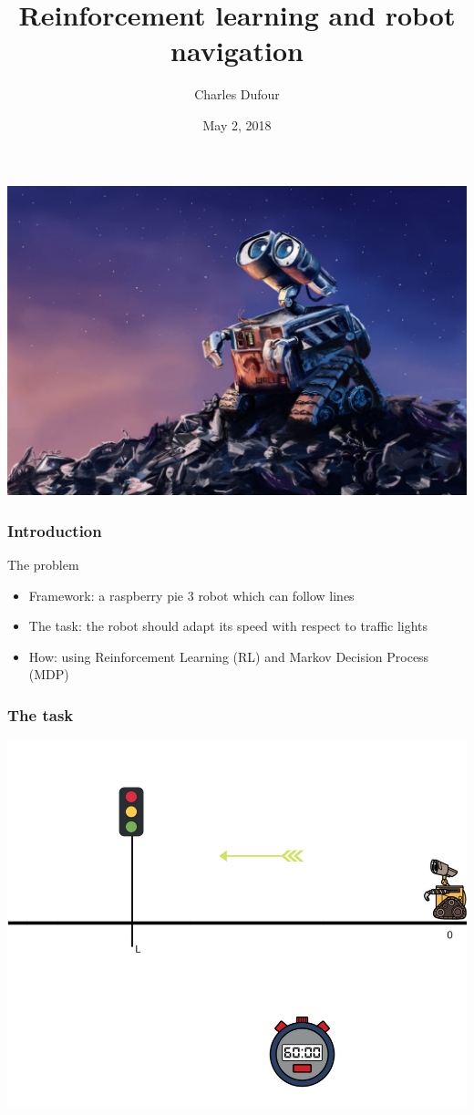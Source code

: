\documentclass[dvipsnames,svgnames]{beamer}
\author{Charles Dufour}
\title{Reinforcement learning and robot navigation }
\date{May 2, 2018}
\begin{document}
\begin{frame}
\titlepage
\centering
\includegraphics[scale=1]{img/Wall-E.jpg}
\end{frame}




\begin{frame}
\frametitle{Introduction}
\begin{block}{The problem}

  \begin{itemize}
   \item Framework: a raspberry pie 3 robot which can follow lines
   \item The task: the robot should adapt its speed with respect to traffic lights
   \item How: using Reinforcement Learning (RL) and Markov Decision Process (MDP)  
  \end{itemize}
\end{block} 
\end{frame}

\begin{frame}
\frametitle{The task}
\begin{center}
\includegraphics[scale=0.4]{img/illustration_traffic_light.png}
\end{center}
\end{frame}
\end{document}

